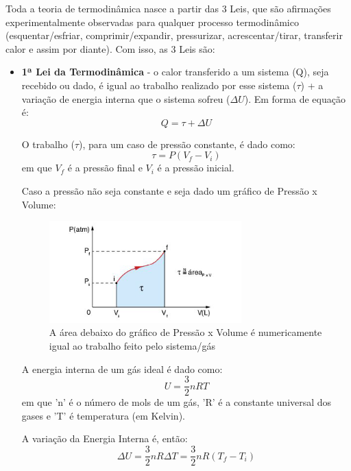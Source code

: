 \documentclass[12pt]{extarticle}
\newcommand{\<}{\langle}
\renewcommand{\>}{\rangle}
\theoremstyle{definition}
\begin{document}
Toda a teoria de termodinâmica nasce a partir das 3 Leis, que são afirmações experimentalmente observadas para qualquer processo termodinâmico (esquentar/esfriar, comprimir/expandir, pressurizar, acrescentar/tirar, transferir calor e assim por diante). Com isso, as 3 Leis são:
\begin{itemize}
    \item \textbf{1ª Lei da Termodinâmica} - o calor transferido a um sistema (Q), seja recebido ou dado, é igual ao trabalho realizado por esse sistema ($\tau$) + a variação de energia interna que o sistema sofreu ($\Delta U$). Em forma de equação é:
\begin{equation}
    Q = \tau + \Delta U
\end{equation}

O trabalho ($\tau$), para um caso de pressão constante, é dado como:
\begin{equation}
    \tau = P(V_f - V_i)
\end{equation}
\noindent em que $V_f$ é a pressão final e $V_i$ é a pressão inicial.

Caso a pressão não seja constante e seja dado um gráfico de Pressão x Volume:
\begin{figure}[h]
    \centering
    \includegraphics[width=0.7\textwidth]{work.png}
    \caption{A área debaixo do gráfico de Pressão x Volume é numericamente igual ao trabalho feito pelo sistema/gás}
    \end{figure}
    
A energia interna de um gás ideal é dado como:
\begin{equation}
    U= \frac{3}{2}nR T
\end{equation}
\noindent em que 'n' é o número de mols de um gás, 'R' é a constante universal dos gases e 'T' é temperatura (em Kelvin).

A variação da Energia Interna é, então:
\begin{equation}
    \Delta U = \frac{3}{2}nR \Delta T = \frac{3}{2}nR(T_f-T_i)
\end{equation}


\end{itemize}
\end{document}
